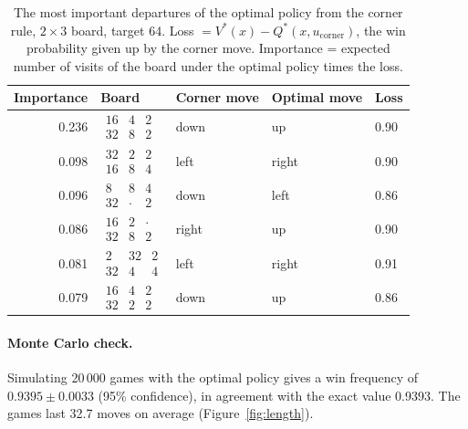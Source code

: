 \documentclass[11pt,a4paper]{article}
\theoremstyle{remark}
\begin{document}
\begin{table}[ht]
\centering
\begin{tabular}{rllll}
\toprule
Importance & Board & Corner move & Optimal move & Loss\\
\midrule
0.236 & $\begin{smallmatrix}16&4&2\\32&8&2\end{smallmatrix}$ & down & up & 0.90\\[1ex]
0.098 & $\begin{smallmatrix}32&2&2\\16&8&4\end{smallmatrix}$ & left & right & 0.90\\[1ex]
0.096 & $\begin{smallmatrix}8&8&4\\32&\cdot&2\end{smallmatrix}$ & down & left & 0.86\\[1ex]
0.086 & $\begin{smallmatrix}16&2&\cdot\\32&8&2\end{smallmatrix}$ & right & up & 0.90\\[1ex]
0.081 & $\begin{smallmatrix}2&32&2\\32&4&4\end{smallmatrix}$ & left & right & 0.91\\[1ex]
0.079 & $\begin{smallmatrix}16&4&2\\32&2&2\end{smallmatrix}$ & down & up & 0.86\\
\bottomrule
\end{tabular}
\caption{The most important departures of the optimal policy from the corner rule, $2\times3$ board, target 64. Loss $=V^*(x)-Q^*(x,u_{\mathrm{corner}})$, the win probability given up by the corner move. Importance = expected number of visits of the board under the optimal policy times the loss.}
\label{tab:exceptions}
\end{table}

\paragraph{Monte Carlo check.} Simulating 20\,000 games with the optimal policy gives a win frequency of $0.9395\pm0.0033$ (95\% confidence), in agreement with the exact value 0.9393. The games last 32.7 moves on average (Figure~\ref{fig:length}).
\end{document}
